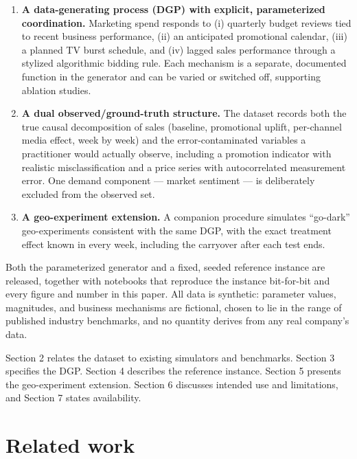 \documentclass[
  conference]{IEEEtran}
\providecommand{\tightlist}{%
  \setlength{\itemsep}{0pt}\setlength{\parskip}{0pt}}
\begin{document}
\begin{enumerate}
\def\labelenumi{\arabic{enumi}.}
\tightlist
\item
  \textbf{A data-generating process (DGP) with explicit, parameterized
  coordination.} Marketing spend responds to (i) quarterly budget
  reviews tied to recent business performance, (ii) an anticipated
  promotional calendar, (iii) a planned TV burst schedule, and (iv)
  lagged sales performance through a stylized algorithmic bidding rule.
  Each mechanism is a separate, documented function in the generator and
  can be varied or switched off, supporting ablation studies.
\item
  \textbf{A dual observed/ground-truth structure.} The dataset records
  both the true causal decomposition of sales (baseline, promotional
  uplift, per-channel media effect, week by week) and the
  error-contaminated variables a practitioner would actually observe,
  including a promotion indicator with realistic misclassification and a
  price series with autocorrelated measurement error. One demand
  component --- market sentiment --- is deliberately excluded from the
  observed set.
\item
  \textbf{A geo-experiment extension.} A companion procedure simulates
  ``go-dark'' geo-experiments consistent with the same DGP, with the
  exact treatment effect known in every week, including the carryover
  after each test ends.
\end{enumerate}

Both the parameterized generator and a fixed, seeded reference instance
are released, together with notebooks that reproduce the instance
bit-for-bit and every figure and number in this paper. All data is
synthetic: parameter values, magnitudes, and business mechanisms are
fictional, chosen to lie in the range of published industry benchmarks,
and no quantity derives from any real company's data.

Section 2 relates the dataset to existing simulators and benchmarks.
Section 3 specifies the DGP. Section 4 describes the reference instance.
Section 5 presents the geo-experiment extension. Section 6 discusses
intended use and limitations, and Section 7 states availability.

\section{Related work}\label{related-work}
\end{document}
